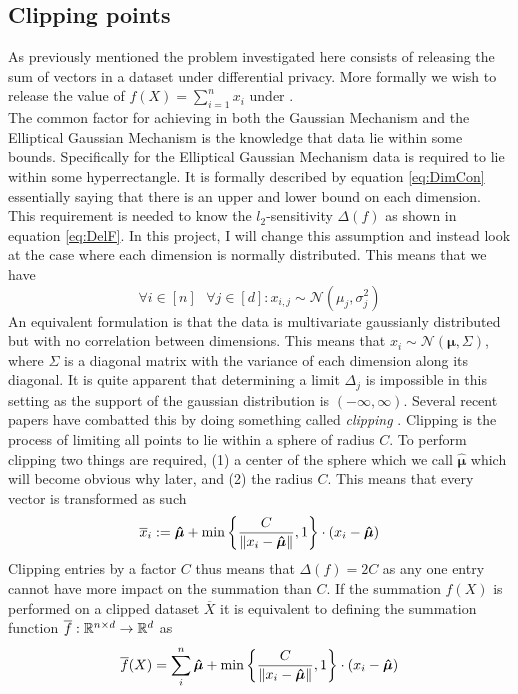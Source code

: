 \documentclass[a4paper,12pt]{article}
\begin{document}
\subsection{Clipping points}
\label{seq:problem}
As previously mentioned the problem investigated here consists of releasing the sum of vectors 
in a dataset under differential privacy.
More formally we wish to release the value of 
$ f(X) = \sum_{i = 1}^n x_i  $
under \edp. \\
The common factor for achieving \edp in both the Gaussian Mechanism
and the Elliptical Gaussian Mechanism is the knowledge that data lie within some bounds.
Specifically for the Elliptical Gaussian Mechanism data is required to lie within some hyperrectangle.
It is formally described by equation \eqref{eq:DimCon} 
essentially saying that there is an upper and lower bound on each dimension.
This requirement is needed to know the $l_2$-sensitivity $ \Delta(f) $ as shown in equation \eqref{eq:DelF}.
In this project, I will change this assumption and instead 
look at the case where each dimension is normally distributed.
This means that we have
\[
    \forall i \in [n] \text{ } \forall j \in [d] : x_{i,j} \sim \mathcal{N}(\mu_j, \sigma_j^2)
\]
An equivalent formulation is that the data is 
multivariate gaussianly distributed but with no correlation between dimensions.
This means that $x_i \sim \mathcal{N}(\bm{\mu}, \Sigma ) $, 
where $\Sigma$ is a diagonal matrix with the variance of each 
dimension along its diagonal.
It is quite apparent that determining a limit $ \Delta_j $ is impossible 
in this setting as the support of the gaussian distribution is $ (-\infty, \infty)$.
Several recent papers have combatted this by doing something called 
\textit{clipping} \cite{Huang2021,coinpress}. 
Clipping is the process of limiting all points to lie within a sphere of radius $C$.
To perform clipping two things are required, (1) a center of the sphere which we call $\bm{\hat{\mu}}$
which will become obvious why later, and (2) the radius $C$.
This means that every vector is transformed as such
\[
    \overline{x}_i := \bm{\hat{\mu}} + \min \left \{\frac{C}{\| x_i - \bm{\hat{\mu}} \|}, 1\right\} \cdot (x_i - \bm{\hat{\mu}})
\]
Clipping entries by a factor $C$ thus means that $ \Delta(f) = 2C $ 
as any one entry cannot have more impact on the summation than $C$.
If the summation $f(X)$ is 
performed on a clipped dataset $\overline{X}$ it is equivalent to
defining the summation function $\overline{f}: \mathbb{R}^{n \times d} \rightarrow \mathbb{R}^d$ as
\[
    \overline{f}(X) = \sum_i^n \bm{\hat{\mu}} + \min \left \{ \frac{C}{\| x_i - \bm{\hat{\mu}} \|}, 1\right\} \cdot (x_i - \bm{\hat{\mu}})
\]
\end{document}

